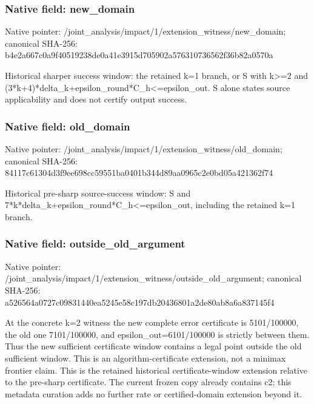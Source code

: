 \documentclass[10pt,a4paper]{article}
\begin{document}
\subsubsection{Native field: new\_\allowbreak{}domain}
Native pointer: /joint\_\allowbreak{}analysis/impact/1/extension\_\allowbreak{}witness/new\_\allowbreak{}domain; canonical SHA-256: b4e2a667c0a9f40519238de0a41e3915d705902a576310736562f36b82a0570a

\begingroup\raggedright\sloppy Historical sharper success window:\allowbreak{} the retained k=\allowbreak{}1 branch,\allowbreak{} or S with k>=\allowbreak{}2 and (3*k+4)*delta\_\allowbreak{}k+epsilon\_\allowbreak{}round*C\_\allowbreak{}h<=\allowbreak{}epsilon\_\allowbreak{}out. S alone states source applicability and does not certify output success.\par\endgroup

\subsubsection{Native field: old\_\allowbreak{}domain}
Native pointer: /joint\_\allowbreak{}analysis/impact/1/extension\_\allowbreak{}witness/old\_\allowbreak{}domain; canonical SHA-256: 84117c61304d3f9ee698cc59551ba0401b344d89aa0965c2e0bd05a421362f74

\begingroup\raggedright\sloppy Historical pre-sharp source-success window:\allowbreak{} S and 7*k*delta\_\allowbreak{}k+epsilon\_\allowbreak{}round*C\_\allowbreak{}h<=\allowbreak{}epsilon\_\allowbreak{}out,\allowbreak{} including the retained k=\allowbreak{}1 branch.\par\endgroup

\subsubsection{Native field: outside\_\allowbreak{}old\_\allowbreak{}argument}
Native pointer: /joint\_\allowbreak{}analysis/impact/1/extension\_\allowbreak{}witness/outside\_\allowbreak{}old\_\allowbreak{}argument; canonical SHA-256: a526564a0727c09831440ea5245e58c197db20436801a2de80ab8a6a837145f4

\begingroup\raggedright\sloppy At the concrete k=\allowbreak{}2 witness the new complete error certificate is 5101/\allowbreak{}100000,\allowbreak{} the old one 7101/\allowbreak{}100000,\allowbreak{} and epsilon\_\allowbreak{}out=\allowbreak{}6101/\allowbreak{}100000 is strictly between them. Thus the new sufficient certificate window contains a legal point outside the old sufficient window. This is an algorithm-certificate extension,\allowbreak{} not a minimax frontier claim. This is the retained historical certificate-window extension relative to the pre-sharp certificate. The current frozen copy already contains c2;\allowbreak{} this metadata curation adds no further rate or certified-domain extension beyond it.\par\endgroup
\end{document}
